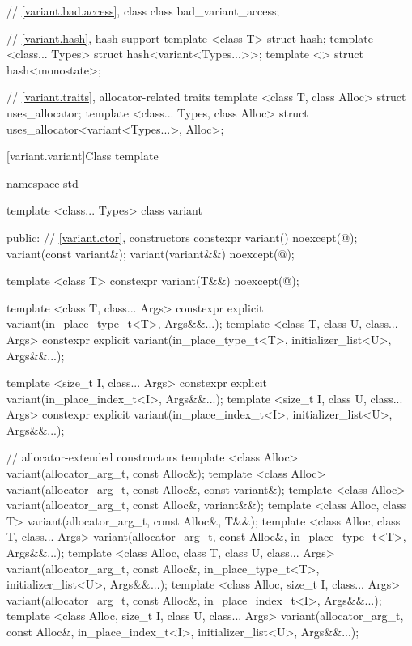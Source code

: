 \begin{codeblock}
{  // \ref{variant.bad.access}, class 
  class bad_variant_access;

  // \ref{variant.hash}, hash support
  template <class T> struct hash;
  template <class... Types> struct hash<variant<Types...>>;
  template <> struct hash<monostate>;

  // \ref{variant.traits}, allocator-related traits
  template <class T, class Alloc> struct uses_allocator;
  template <class... Types, class Alloc> struct uses_allocator<variant<Types...>, Alloc>;
}
\end{codeblock}

%
[variant.variant]{Class template }

\begin{codeblock}
namespace std {
  template <class... Types>
    class variant {
    public:
      // \ref{variant.ctor}, constructors
      constexpr variant() noexcept(@\seebelow@);
      variant(const variant&);
      variant(variant&&) noexcept(@\seebelow@);

      template <class T>
        constexpr variant(T&&) noexcept(@\seebelow@);

      template <class T, class... Args>
        constexpr explicit variant(in_place_type_t<T>, Args&&...);
      template <class T, class U, class... Args>
        constexpr explicit variant(in_place_type_t<T>, initializer_list<U>, Args&&...);

      template <size_t I, class... Args>
        constexpr explicit variant(in_place_index_t<I>, Args&&...);
      template <size_t I, class U, class... Args>
        constexpr explicit variant(in_place_index_t<I>, initializer_list<U>, Args&&...);

      // allocator-extended constructors
      template <class Alloc>
        variant(allocator_arg_t, const Alloc&);
      template <class Alloc>
        variant(allocator_arg_t, const Alloc&, const variant&);
      template <class Alloc>
        variant(allocator_arg_t, const Alloc&, variant&&);
      template <class Alloc, class T>
        variant(allocator_arg_t, const Alloc&, T&&);
      template <class Alloc, class T, class... Args>
        variant(allocator_arg_t, const Alloc&, in_place_type_t<T>, Args&&...);
      template <class Alloc, class T, class U, class... Args>
        variant(allocator_arg_t, const Alloc&, in_place_type_t<T>,
                initializer_list<U>, Args&&...);
      template <class Alloc, size_t I, class... Args>
        variant(allocator_arg_t, const Alloc&, in_place_index_t<I>, Args&&...);
      template <class Alloc, size_t I, class U, class... Args>
        variant(allocator_arg_t, const Alloc&, in_place_index_t<I>,
                initializer_list<U>, Args&&...);

}}
\end{codeblock}
